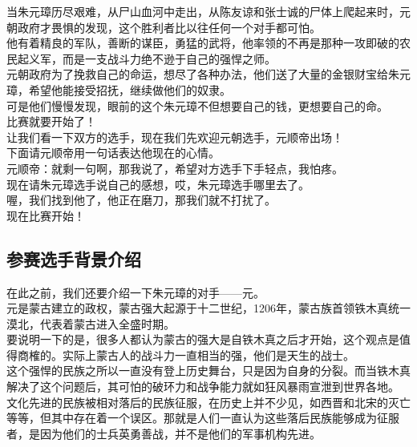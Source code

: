 \begin{multicols}{\theparacolNo}
当朱元璋历尽艰难，从尸山血河中走出，从陈友谅和张士诚的尸体上爬起来时，元朝政府才畏惧的发现，这个胜利者比以往任何一个对手都可怕。\\

他有着精良的军队，善断的谋臣，勇猛的武将，他率领的不再是那种一攻即破的农民起义军，而是一支战斗力绝不逊于自己的强悍之师。\\

元朝政府为了挽救自己的命运，想尽了各种办法，他们送了大量的金银财宝给朱元璋，希望他能接受招抚，继续做他们的奴隶。\\

可是他们慢慢发现，眼前的这个朱元璋不但想要自己的钱，更想要自己的命。\\

比赛就要开始了！\\

让我们看一下双方的选手，现在我们先欢迎元朝选手，元顺帝出场！\\

下面请元顺帝用一句话表达他现在的心情。\\

元顺帝：就剩一句啊，那我说了，希望对方选手下手轻点，我怕疼。\\

现在请朱元璋选手说自己的感想，哎，朱元璋选手哪里去了。\\

喔，我们找到他了，他正在磨刀，那我们就不打扰了。\\

现在比赛开始！\\

\subsection{参赛选手背景介绍}
在此之前，我们还要介绍一下朱元璋的对手——元。\\

元是蒙古建立的政权，蒙古强大起源于十二世纪，1206年，蒙古族首领铁木真统一漠北，代表着蒙古进入全盛时期。\\

要说明一下的是，很多人都认为蒙古的强大是自铁木真之后才开始，这个观点是值得商榷的。实际上蒙古人的战斗力一直相当的强，他们是天生的战士。\\

这个强悍的民族之所以一直没有登上历史舞台，只是因为自身的分裂。而当铁木真解决了这个问题后，其可怕的破环力和战争能力就如狂风暴雨宣泄到世界各地。\\

文化先进的民族被相对落后的民族征服，在历史上并不少见，如西晋和北宋的灭亡等等，但其中存在着一个误区。那就是人们一直认为这些落后民族能够成为征服者，是因为他们的士兵英勇善战，并不是他们的军事机构先进。\\


\end{multicols}
